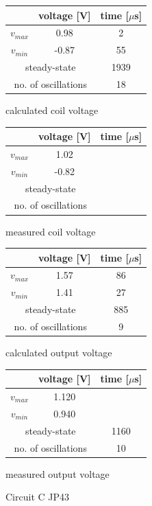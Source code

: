 \documentclass[notitlepage, a4paper, 11pt]{article}
\begin{document}
	\begin{figure}[H]
		\begin{subtable}{0.45 \textwidth}
			\centering
			\begin{tabular}{|c|c|c|}
				\hline
				& voltage [V] & time [$\mu$s] \\
				\hline
				$v_{max}$ & 0.98 & 2 \\
				\hline
				$v_{min}$ & -0.87 & 55 \\
				\hline
				\multicolumn{2}{|c|}{ steady-state} & 1939 \\
				\hline \hline
				\multicolumn{2}{|c|}{no. of oscillations} & 18 \\
				\hline
			\end{tabular}
			\caption{calculated coil voltage}
		\end{subtable}
		\hfill
		\begin{subtable}{0.45 \textwidth}
			\centering
			\begin{tabular}{|c|c|c|}
				\hline
				& voltage [V] & time [$\mu$s] \\
				\hline
				$v_{max}$ & 1.02 &  \\
				\hline
				$v_{min}$ & -0.82 &  \\
				\hline
				\multicolumn{2}{|c|}{ steady-state} &  \\
				\hline \hline
				\multicolumn{2}{|c|}{no. of oscillations} &  \\
				\hline
			\end{tabular}
			\caption{measured coil voltage}
		\end{subtable}
				\begin{subtable}{0.45 \textwidth}
			\centering
			\begin{tabular}{|c|c|c|}
	\hline
& voltage [V] & time [$\mu$s] \\
\hline
$v_{max}$ & 1.57 & 86 \\
\hline
$v_{min}$ & 1.41 & 27\\
\hline
\multicolumn{2}{|c|}{ steady-state} & 885 \\
\hline \hline
\multicolumn{2}{|c|}{no. of oscillations} & 9 \\
\hline
			\end{tabular}
			\caption{calculated output voltage}
		\end{subtable}
		\hfill
		\begin{subtable}{0.45 \textwidth}
			\centering
			\begin{tabular}{|c|c|c|}
				\hline
				& voltage [V] & time [$\mu$s] \\
				\hline
				$v_{max}$ & 1.120 &  \\
				\hline
				$v_{min}$ & 0.940 &  \\
				\hline
				\multicolumn{2}{|c|}{ steady-state} & 1160 \\
				\hline \hline
				\multicolumn{2}{|c|}{no. of oscillations} & 10 \\
				\hline
			\end{tabular}
			\caption{measured output voltage}
		\end{subtable}
		\caption{Circuit C JP43}
	\end{figure}
	
\end{document}
